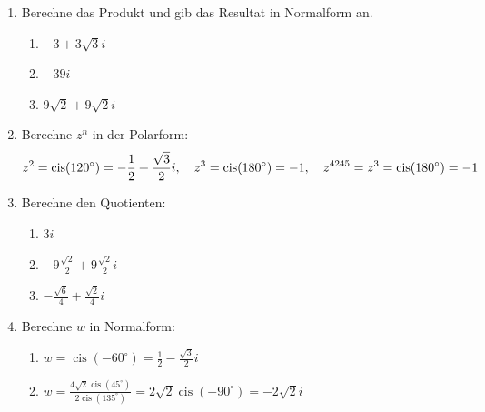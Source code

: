 \begin{enumerate}
    \item Berechne das Produkt und gib das Resultat in Normalform an.
    \begin{enumerate}
        \item $-3+3\sqrt{3}i$
        \item $-39i$
        \item $9\sqrt{2}+9\sqrt{2}i$
    \end{enumerate}


    \item Berechne $z^n$ in der Polarform:
    $$ z^2 = \operatorname{cis}(120^\circ) = -\frac{1}{2} + \frac{\sqrt{3}}{2}i, \quad z^3 = \operatorname{cis}(180^\circ) = -1, \quad z^{4245} = z^3 = \mathrm{cis}(180^\circ) = -1$$

    \item Berechne den Quotienten:
    \begin{enumerate}
        \item $3 i$
        \item $-9\frac{\sqrt{2}}{2} +9\frac{\sqrt{2}}{2}i$
        \item $-\frac{\sqrt{6}}{4}+ \frac{\sqrt{2}}{4}i$
    \end{enumerate}

    \item Berechne $w$ in Normalform:
    \begin{enumerate}
        \item $w = \operatorname{cis}(-60^\circ) = \frac{1}{2} - \frac{\sqrt{3}}{2} i$
        \item $w = \frac{4 \sqrt{2} \operatorname{cis}(45^\circ)}{2 \operatorname{cis}(135^\circ)} = 2\sqrt{2} \operatorname{cis}(-90^\circ) = -2\sqrt{2}i$
    \end{enumerate}


\end{enumerate}
